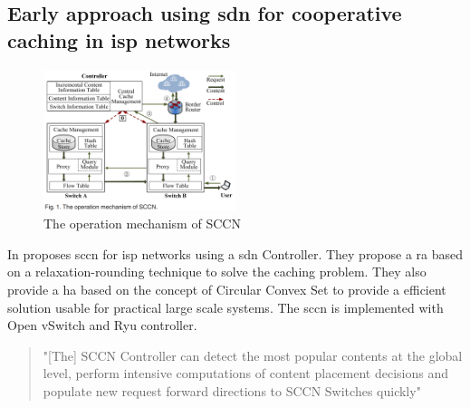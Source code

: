 \documentclass[conference]{IEEEtran}
\begin{document}
	\subsection{Early approach using \ac{sdn} for cooperative caching in \ac{isp} networks}
	\label{sec:priority-caching}
	\begin{figure}
		\centering
		\includegraphics[width=0.5\textwidth]{figures/sccn-architecture.png}
		\caption{The operation mechanism of SCCN \cite{caching-7}}
		\label{fig:sccn-architecture}
	\end{figure}

	In \citeyear{caching-7} \cite{caching-7} proposes \ac{sccn} for \ac{isp} networks using a \ac{sdn} Controller. They propose a \ac{ra} based on a relaxation-rounding technique \cite{ra} to solve the caching problem. They also provide a \ac{ha} based on the concept of Circular Convex Set \cite{heuristcs} to provide a efficient solution usable for practical large scale systems. The \ac{sccn} is implemented with Open vSwitch and Ryu controller.

	\begin{quote}
		"[The] SCCN Controller can detect the most popular contents at the global level, perform intensive computations of content placement decisions and populate new request forward directions to SCCN Switches quickly" \cite{caching-7}
	\end{quote}
\end{document}
